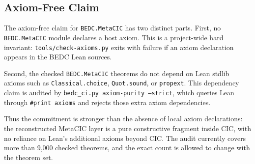 \subsection{Axiom-Free Claim}\label{subsec:reconstruction-axiom-free-claim}

The axiom-free claim for \texttt{BEDC.MetaCIC} has two distinct parts. First,
no \texttt{BEDC.MetaCIC} module declares a host axiom. This is a project-wide
hard invariant: \texttt{tools/check-axioms.py} exits with failure if an axiom
declaration appears in the BEDC Lean sources.

Second, the checked \texttt{BEDC.MetaCIC} theorems do not depend on Lean
stdlib axioms such as \texttt{Classical.choice}, \texttt{Quot.sound}, or
\texttt{propext}. This dependency claim is audited by
\texttt{bedc\_ci.py axiom-purity --strict}, which queries Lean through
\texttt{\#print axioms} and rejects those extra axiom dependencies.

Thus the commitment is stronger than the absence of local axiom declarations:
the reconstructed MetaCIC layer is a pure constructive fragment inside CIC,
with no reliance on Lean's additional axioms beyond CIC. The audit currently
covers more than 9,000 checked theorems, and the exact count is allowed to
change with the theorem set.
